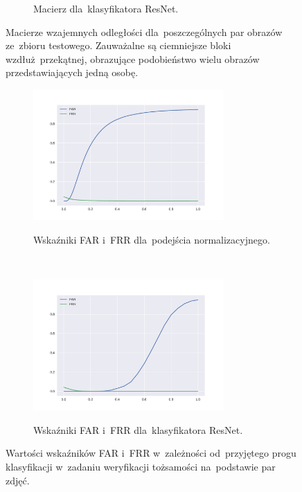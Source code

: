 \documentclass[11pt,a4paper]{article}
\begin{document}
\begin{figure}[H]
\begin{subfigure}{\textwidth}
        \label{subfig:resnet-distance-matrix}
        \caption{Macierz dla~klasyfikatora ResNet.}
    \end{subfigure}
    \caption{Macierze wzajemnych odległości dla~poszczególnych par obrazów ze~zbioru testowego.
    Zauważalne są ciemniejsze bloki wzdłuż~przekątnej, obrazujące podobieństwo wielu obrazów przedstawiających jedną osobę.}
\end{figure}

\begin{figure}[H]
    \begin{subfigure}{\textwidth}
        \centering
        \includegraphics[width=0.8\textwidth]{res/img/normalized_error_rates.pdf}
        \label{subfig:normalized-error-rates}
        \caption{Wskaźniki FAR i~FRR dla~podejścia normalizacyjnego.}
    \end{subfigure}
    \\
    \begin{subfigure}{\textwidth}
        \centering
        \includegraphics[width=0.8\textwidth]{res/img/resnet_error_rates.pdf}
        \label{subfig:resnet-error-rates}
        \caption{Wskaźniki FAR i~FRR dla~klasyfikatora ResNet.}
    \end{subfigure}
    \caption{Wartości wskaźników FAR i~FRR w~zależności od~przyjętego progu klasyfikacji w~zadaniu weryfikacji tożsamości na~podstawie par zdjęć.}
\end{figure}
\end{document}
